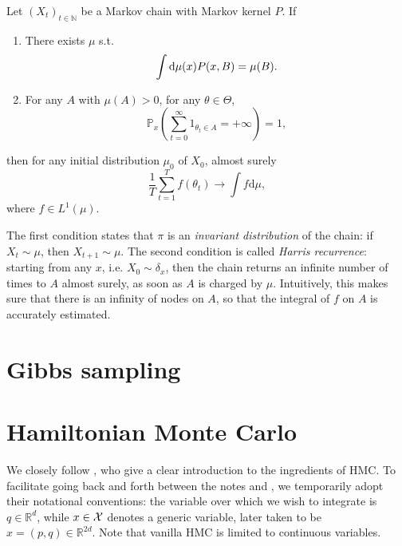 \begin{proposition}
    Let $(X_t)_{t\in\mathbb N}$ be a Markov chain with Markov kernel $P$.
    If
    \begin{enumerate}
      \item There exists $\mu$ s.t. 
      $$
      \int \mathrm{d}\mu(x) P(x, B) = \mu(B).
      $$
      \item For any $A$ with $\mu(A)>0$, for any $\theta\in \Theta$,
      $$ 
      \mathbb{P}_{x} \left(\sum_{t=0}^\infty 1_{\theta_t\in A} = +\infty\right) = 1,
      $$
    \end{enumerate}
    then for any initial distribution $\mu_0$ of $X_0$, almost surely
    $$
    \frac{1}{T} \sum_{t=1}^T f(\theta_t) \rightarrow \int f\mathrm{d}\mu,
    $$
    where $f\in L^1(\mu)$. 
\end{proposition}
The first condition states that $\pi$ is an \emph{invariant distribution} of the chain: if $X_t\sim\mu$, then $X_{t+1}\sim\mu$. 
The second condition is called \emph{Harris recurrence}: starting from any $x$, i.e. $X_0\sim\delta_{x}$, then the chain returns an infinite number of times to $A$ almost surely, as soon as $A$ is charged by $\mu$. 
Intuitively, this makes sure that there is an infinity of nodes on $A$, so that the integral of $f$ on $A$ is accurately estimated.

\section{Gibbs sampling}

\section{Hamiltonian Monte Carlo}
We closely follow \cite{BoSa18}, who give a clear introduction to the ingredients of HMC.
To facilitate going back and forth between the notes and \citep{BoSa18}, we temporarily adopt their notational conventions: the variable over which we wish to integrate is $q\in\mathbb{R}^d$, while $x\in\mathcal{X}$ denotes a generic variable, later taken to be $x=(p,q)\in\mathbb{R}^{2d}$.
Note that vanilla HMC is limited to continuous variables.

